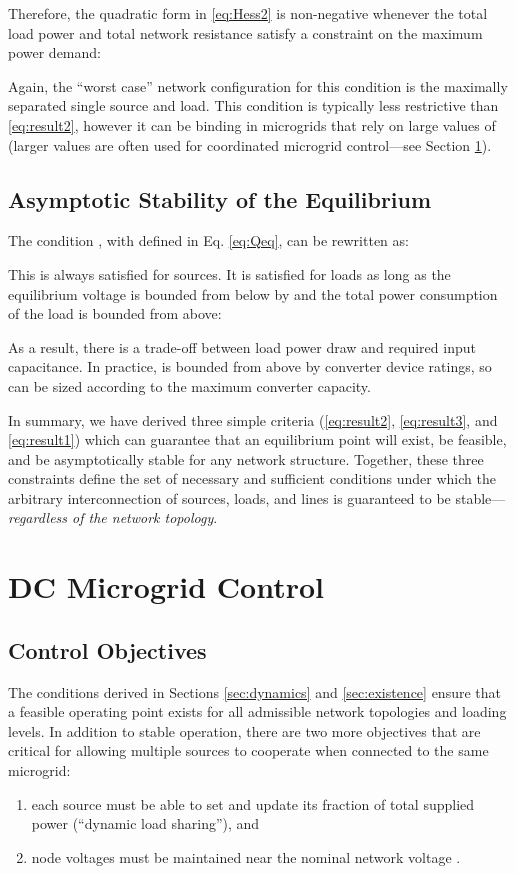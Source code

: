 \documentclass[letterpaper, 10 pt, conference]{ieeeconf}
\begin{document}
Therefore, the quadratic form in \eqref{eq:Hess2} is non-negative whenever the total load power and total network resistance satisfy a constraint on the maximum power demand:


Again, the ``worst case'' network configuration for this condition is the maximally separated single source and load. This condition is typically less restrictive than \eqref{eq:result2}, however it can be binding in microgrids that rely on large values of  (larger  values are often used for coordinated microgrid control---see Section \ref{sec:control}).

\subsection{Asymptotic Stability of the Equilibrium}

The condition , with  defined in Eq. \eqref{eq:Qeq}, can be rewritten as:

This is always satisfied for sources. It is satisfied for loads as long as the equilibrium voltage is bounded from below by  and the total power consumption of the load is bounded from above:

As a result, there is a trade-off between load power draw and required input capacitance. In practice,  is bounded from above by converter device ratings, so  can be sized according to the maximum converter capacity.

In summary, we have derived three simple criteria (\eqref{eq:result2}, \eqref{eq:result3}, and \eqref{eq:result1}) which can guarantee that an equilibrium point will exist, be feasible, and be asymptotically stable for any network structure. Together, these three constraints define the set of necessary and sufficient conditions under which the arbitrary interconnection of sources, loads, and lines is guaranteed to be stable---\textit{regardless of the network topology}.

\section{DC Microgrid Control}\label{sec:control}

\subsection{Control Objectives}

The conditions derived in Sections \ref{sec:dynamics} and \ref{sec:existence} ensure that a feasible operating point exists for all admissible network topologies and loading levels. In addition to stable operation, there are two more objectives that are critical for allowing multiple sources to cooperate when connected to the same microgrid:
\begin{enumerate}
    \item each source must be able to set and update its fraction of total supplied power (``dynamic load sharing''), and
    \item node voltages  must be maintained near the nominal network voltage .
\end{enumerate}
\end{document}
